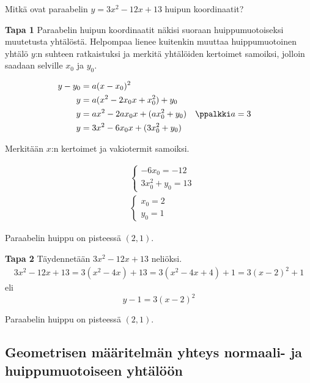 \begin{esimerkki}
	Mitkä ovat paraabelin $y=3x^2-12x+13$ huipun koordinaatit?
	\begin{esimratk} \textbf{Tapa 1}
		Paraabelin huipun koordinaatit näkisi suoraan huippumuotoiseksi muutetusta yhtälöstä. Helpompaa lienee kuitenkin muuttaa huippumuotoinen yhtälö $y$:n suhteen ratkaistuksi ja merkitä yhtälöiden kertoimet samoiksi, jolloin saadaan selville $x_0$ ja $y_0$.

		\begin{align*}
			y-y_0	&= a(x-x_0)^2 \\
			y       &= a(x^2-2x_0x+x_0^2)+y_0\\
			y       &= ax^2-2ax_0x+(ax_0^2+y_0) &&\ppalkki a=3\\
			y       &= 3x^2-6x_0x+(3x_0^2+y_0)
		\end{align*}

		Merkitään $x$:n kertoimet ja vakiotermit samoiksi.

		\begin{align*}
			&\begin{cases}
				-6x_0=-12 \\
				3x_0^2+y_0 =13
			\end{cases}\\
			&\begin{cases}
				x_0=2 \\
				y_0 =1
			\end{cases}
		\end{align*}
		\begin{esimvast}
			Paraabelin huippu on pisteessä $(2, 1)$.
		\end{esimvast}

		\begin{esimratk} \textbf{Tapa 2}
			Täydennetään $3x^2-12x+13$ neliöksi.
			\begin{align*}
				3x^2-12x+13 = 3(x^2-4x)+13 = 3(x^2-4x+4)+1 = 3(x-2)^2+1
			\end{align*}
			eli
			\[ y-1 = 3(x-2)^2 \]
			\begin{esimvast}
			Paraabelin huippu on pisteessä $(2, 1)$.
\end{esimvast}
\end{esimratk}

\end{esimratk}
\end{esimerkki}

\subsection{Geometrisen määritelmän yhteys normaali- ja huippumuotoiseen yhtälöön}

